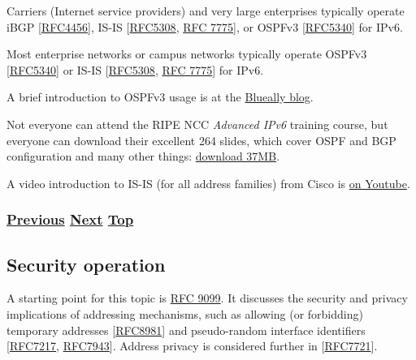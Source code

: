 \documentclass[
]{article}
\begin{document}
Carriers (Internet service providers) and very large enterprises
typically operate iBGP
{[}\href{https://www.rfc-editor.org/info/rfc4456}{RFC4456}{]}, IS-IS
{[}\href{https://www.rfc-editor.org/info/rfc5308}{RFC5308},
\href{https://www.rfc-editor.org/info/rfc7775}{RFC 7775}{]}, or OSPFv3
{[}\href{https://www.rfc-editor.org/info/rfc5340}{RFC5340}{]} for IPv6.

Most enterprise networks or campus networks typically operate OSPFv3
{[}\href{https://www.rfc-editor.org/info/rfc5340}{RFC5340}{]} or IS-IS
{[}\href{https://www.rfc-editor.org/info/rfc5308}{RFC5308},
\href{https://www.rfc-editor.org/info/rfc7775}{RFC 7775}{]} for IPv6.

A brief introduction to OSPFv3 usage is at the
\href{https://www.blueally.com/ipv6-deployment-series-part-3-ospfv3/}{Blueally
blog}.

Not everyone can attend the RIPE NCC \emph{Advanced IPv6} training
course, but everyone can download their excellent 264 slides, which
cover OSPF and BGP configuration and many other things:
\href{https://www.ripe.net/documents/3822/AdvancedIPv6-Slides_xDUF4U9.pdf}{download
37MB}.

A video introduction to IS-IS (for all address families) from Cisco is
\href{https://youtu.be/jWdD8SCwzHk}{on Youtube}.

\subsubsection{\texorpdfstring{\hyperref[benchmarking-and-monitoring]{Previous}
\hyperref[security-operation]{Next}
\hyperref[management-and-operations]{Top}}{Previous Next Top}}\label{previous-next-top-29}

\pagebreak

\subsection{Security operation}\label{security-operation}

A starting point for this topic is
\href{https://www.rfc-editor.org/info/rfc9099}{RFC 9099}. It discusses
the security and privacy implications of addressing mechanisms, such as
allowing (or forbidding) temporary addresses
{[}\href{https://www.rfc-editor.org/info/rfc8981}{RFC8981}{]} and
pseudo-random interface identifiers
{[}\href{https://www.rfc-editor.org/info/rfc7217}{RFC7217},
\href{https://www.rfc-editor.org/info/rfc7943}{RFC7943}{]}. Address
privacy is considered further in
{[}\href{https://www.rfc-editor.org/info/rfc7721}{RFC7721}{]}.
\end{document}
